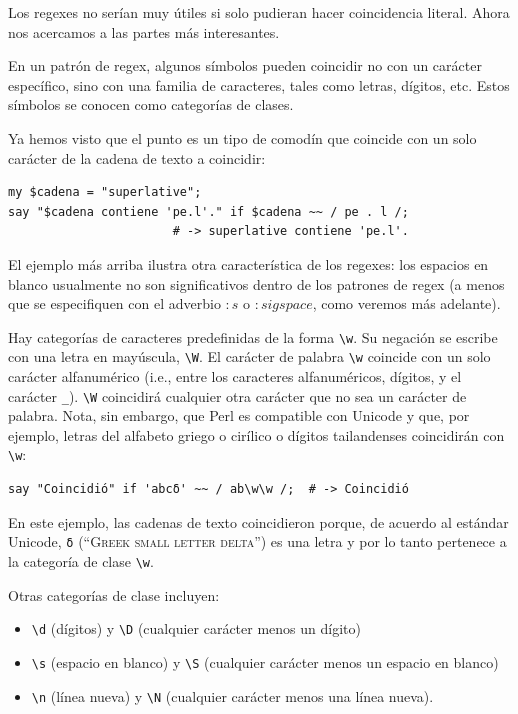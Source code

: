 Los regexes no serían muy útiles si solo pudieran hacer 
coincidencia literal. Ahora nos acercamos a las partes más 
interesantes.

En un patrón de regex, algunos símbolos pueden coincidir no
con un carácter específico, sino con una familia de caracteres,
tales como letras, dígitos, etc. Estos símbolos se conocen como
categorías de clases.

Ya hemos visto que el punto es un tipo de comodín que
coincide con un solo carácter de la cadena de texto a
coincidir:

\begin{lstlisting}
my $cadena = "superlative";
say "$cadena contiene 'pe.l'." if $cadena ~~ / pe . l /;
                       # -> superlative contiene 'pe.l'.
\end{lstlisting}
%

El ejemplo más arriba ilustra otra característica
de los regexes: los espacios en blanco usualmente
no son significativos dentro de los patrones de regex 
(a menos que se especifiquen con el adverbio 
$:s$ o $:sigspace$, como veremos más adelante).

Hay categorías de caracteres predefinidas de la forma \verb|\w|.
Su negación se escribe con una letra en mayúscula, \verb|\W|.
El carácter de palabra \verb|\w| coincide con un solo carácter 
alfanumérico (i.e., entre los caracteres alfanuméricos, dígitos,
y el carácter \verb|_|). \verb|\W| coincidirá cualquier otra carácter
que no sea un carácter de palabra. Nota, sin embargo, que Perl
es compatible con Unicode y que, por ejemplo, letras del alfabeto
griego o cirílico o dígitos tailandenses coincidirán con \verb|\w|:

\begin{lstlisting}
say "Coincidió" if 'abcδ' ~~ / ab\w\w /;  # -> Coincidió
\end{lstlisting}
%

En este ejemplo, las cadenas de texto coincidieron porque, de 
acuerdo al estándar Unicode, \verb|δ| (``\textsc{Greek small letter delta}'')
es una letra y por lo tanto pertenece a la categoría de  
clase \verb|\w|.

Otras categorías de clase incluyen:
\begin{itemize}
\item \verb|\d| (dígitos) y \verb|\D| (cualquier carácter menos un dígito)
\item \verb|\s| (espacio en blanco) y \verb|\S| (cualquier carácter menos un espacio en blanco)
\item \verb|\n| (línea nueva) y \verb|\N| (cualquier carácter menos una línea nueva).
\end{itemize}


